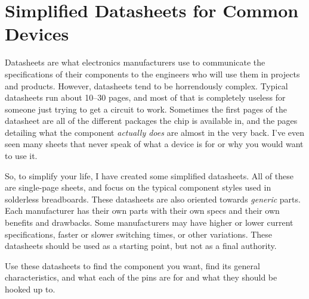 \chapter{Simplified Datasheets for Common Devices}
\label{appSimplifiedDatasheets}

Datasheets are what electronics manufacturers use to communicate the specifications of their components to the engineers who will use them in projects and products.
However, datasheets tend to be horrendously complex.
Typical datasheets run about 10--30 pages, and most of that is completely useless for someone just trying to get a circuit to work.
Sometimes the first pages of the datasheet are all of the different packages the chip is available in, and the pages detailing what the component \emph{actually does} are almost in the very back. 
I've even seen many sheets that never speak of what a device is for or why you would want to use it.

So, to simplify your life, I have created some simplified datasheets.
All of these are single-page sheets, and focus on the typical component styles used in solderless breadboards.
These datasheets are also oriented towards \emph{generic} parts. 
Each manufacturer has their own parts with their own specs and their own benefits and drawbacks.
Some manufacturers may have higher or lower current specifications, faster or slower switching times, or other variations.
These datasheets should be used as a starting point, but not as a final authority.

Use these datasheets to find the component you want, find its general characteristics, and what each of the pins are for and what they should be hooked up to.

